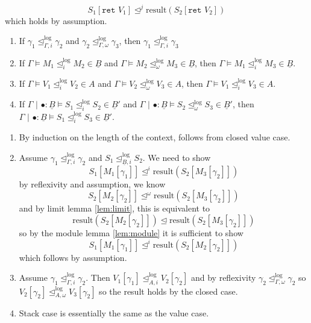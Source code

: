 \documentclass[acmsmall,nonacm]{acmart}
\newif\iflong
\renewcommand{\u}{\underline}
\newcommand{\pipe}{\,\,|\,\,}
\newcommand{\apreorder}{\trianglelefteq}
\newcommand{\ix}[2]{\mathrel{#1^{#2}}}
\newcommand{\itylrof}[3]{\ilrof{#1}{#3,#2}}
\newcommand{\ilrof}[2]{\mathrel{{#1}^{\text{log}}_{#2}}}
\newcommand{\itylr}[2]{\itylrof{\apreorder}{#1}{#2}}
\newcommand{\ilr}[1]{\ilrof{\apreorder}{#1}}
\newcommand{\result}{\text{result}}
\newcommand{\kw}[1]{\texttt{#1}\,\,}
\newcommand{\ret}{\kw{ret}}
\begin{document}
{\begin{longproof}
\begin{enumerate}
    \[ S_1[\ret V_1] \ix\apreorder j \result(S_2[\ret V_2]) \]
    which holds by assumption.
  \end{enumerate}
\end{longproof}
\iflong
\begin{lemma}\hfill
  \begin{enumerate}
  \item If $\gamma_1 \itylr i \Gamma \gamma_2$ and $\gamma_2 \itylr
    \omega \Gamma \gamma_3$, then $\gamma_1 \itylr i \Gamma \gamma_3$
  \item If $\Gamma \vDash M_1 \ilr i M_2 \in \u B$ and
    $\Gamma \vDash M_2 \ilr \omega M_3 \in \u B$, then
    $\Gamma \vDash M_1 \ilr i M_3 \in \u B$.
  \item If $\Gamma \vDash V_1 \ilr i V_2 \in A$ and
    $\Gamma \vDash V_2 \ilr \omega V_3 \in A$, then
    $\Gamma \vDash V_1 \ilr i V_3 \in A$.
  \item If $\Gamma \pipe \bullet : \u B \vDash S_1 \ilr i S_2 \in \u B'$ and
    $\Gamma\pipe \bullet : \u B \vDash S_2 \ilr \omega S_3 \in \u B'$, then
    $\Gamma\pipe \bullet : \u B \vDash S_1 \ilr i S_3 \in \u B'$.
  \end{enumerate}
\end{lemma}
\begin{longproof}
  \begin{enumerate}
  \item By induction on the length of the context, follows from closed value case.
  \item Assume $\gamma_1 \itylr i \Gamma \gamma_2$ and $S_1 \itylr i {\u B} S_2$.
    We need to show
    \[ S_1[M_1[\gamma_1]] \ix\apreorder{i} \result(S_2[M_3[\gamma_2]]) \]
    by reflexivity and assumption, we know
    \[ S_2[M_2[\gamma_2]] \ix\apreorder \omega \result(S_2[M_3[\gamma_2]])\]
    and by limit lemma \ref{lem:limit}, this is equivalent to
    \[ \result(S_2[M_2[\gamma_2]]) \apreorder \result(S_2[M_3[\gamma_2]])\]
    so by the module lemma \ref{lem:module} it is sufficient to show
    \[ S_1[M_1[\gamma_1]] \ix\apreorder{i} \result(S_2[M_2[\gamma_2]]) \]
    which follows by assumption.
  \item Assume $\gamma_1 \itylr i \Gamma \gamma_2$.  Then
    $V_1[\gamma_1] \itylr i A V_2[\gamma_2]$ and by reflexivity
    $\gamma_2 \itylr \omega \Gamma \gamma_2$ so $V_2[\gamma_2] \itylr
    \omega A V_3[\gamma_2]$ so the result holds by the closed case.
  \item Stack case is essentially the same as the value case.

\end{enumerate}
\end{longproof}}
\end{document}
